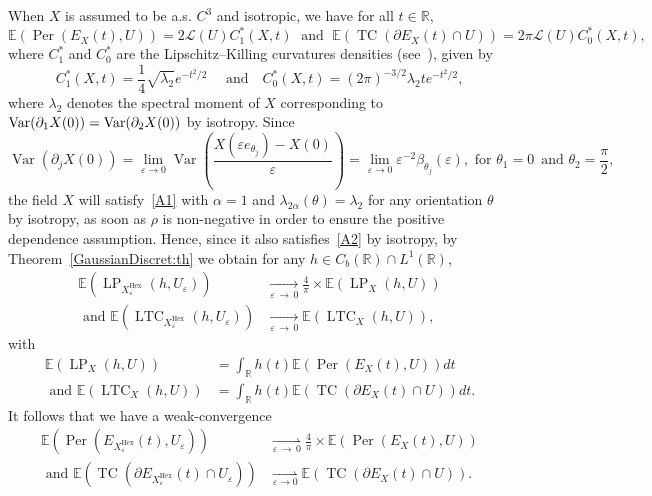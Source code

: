 \documentclass[AHL,Unicode,longabstracts,published]{cedram}
\newcommand{\R}{\mathbb{R}}
\newcommand{\E}{\mathbb{E}}
\newcommand{\eps}{\varepsilon}
\DeclareMathOperator{\TC}{TC}
\DeclareMathOperator{\LTC}{LTC}
\DeclareMathOperator{\LP}{LP}
\DeclareMathOperator{\Per}{Per}
\DeclareMathOperator{\Hex}{Hex}
\DeclareMathOperator{\Var}{Var}
\newcommand{\calL}{\mathcal{L}}
\begin{document}
\begin{rema}
When $X$ is assumed to be a.s. $C^3$ and isotropic, we have for all $t\in\R$,
\[
\E\left(\Per(E_X(t),U)\right) =2{\calL}(U)C_1^\ast(X,t)\;\text{ and }\;
\E\left(\TC(\partial E_X(t)\cap U)\right)= 2\pi {\calL}(U) C_0^\ast(X,t),
\]
where $C_1^\ast$ and $C_0^\ast$ are the Lipschitz--Killing curvatures densities (see~\cite{BDDE-19}), given by
\[
C_1^\ast(X,t)=\frac{1}{4}\sqrt{\lambda_2}e^{-t^2/2} \quad \text{ and
} \quad C_0^\ast(X,t)=(2\pi)^{-3/2}{\lambda_2}te^{-t^2/2},
\]
where $\lambda_2$ denotes the spectral moment of $X$ corresponding to $\Var(\partial_1 X(0))\linebreak=\Var(\partial_2 X(0))$ by isotropy. Since
\[
\Var\left(\partial_j X(0)\right)=\lim_{\eps\rightarrow 0}\Var\left(\frac{X(\eps e_{\theta_j})-X(0)}{\eps}\right)=\lim_{\eps\rightarrow 0}\eps^{-2}\beta_{\theta_j}(\eps),\text{ for }\theta_1=0
\,
\text{ and }\theta_2=\frac{\pi}{2},
\]
the field $X$ will satisfy~\eqref{A1} with $\alpha=1$ and $\lambda_{2\alpha}(\theta)=\lambda_2$ for any orientation $\theta$ by isotropy, as soon as $\rho$ is non-negative in order to ensure the positive dependence assumption. Hence, since it also satisfies~\eqref{A2} by isotropy, by Theorem~\ref{GaussianDiscret:th} we obtain for any $h\in C_b(\R)\cap L^1(\R)$,
\begin{align*}
\E\left(\LP_{X_\eps^{\Hex}}(h,U_\eps)\right)&\underset{\eps\,\to\,
0}{\longrightarrow}\frac{4}{\pi}\times \E(\LP_X(h,U)) \\
\text{ and }
\E\left(\LTC_{X_\eps^{\Hex}}(h,U_\eps)\right)&\underset{\eps\,\to\,0}{\longrightarrow} \E(\LTC_X(h,U)),
\end{align*}
with
\begin{align*} 
\E\left(\LP_X(h,U)\right) &=\int_\R h(t)\E\left(\Per(E_X(t),U)\right) dt
\\
\text{ and } \E\left(\LTC_X(h,U)\right) &=\int_\R h(t) \E\left(\TC(\partial E_X(t)\cap U)\right) dt.
\end{align*}
It follows that we have a weak-convergence
\begin{align*}
\E\left(\Per\left(E_{X_\eps^{\Hex}}(t),U_\eps\right)\right) &\underset{\eps\,\to\,0}{\rightharpoonup} \frac{4}{\pi}\times \E\left(\Per(E_X(t),U)\right)
\\
\text{ and }
\E\left(\TC\left(\partial E_{X_\eps^{\Hex}}(t)\cap U_\eps\right)\right) &\underset{\eps\to 0}{\rightharpoonup}
\E\left(\TC(\partial E_X(t) \cap U)\right).
\end{align*}
\end{rema}
\end{document}
